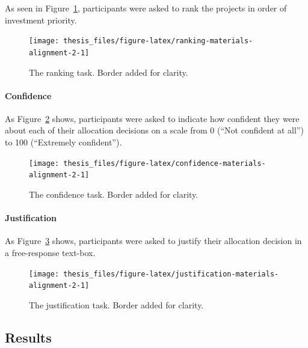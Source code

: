 \documentclass[a4paper, nobind, dvipsnames]{templates/ociamthesis}
\theoremstyle{definition}
\theoremstyle{definition}
\theoremstyle{definition}
\theoremstyle{definition}
\theoremstyle{remark}
\begin{document}
As seen in Figure~\ref{fig:ranking-materials-alignment-2}, participants were
asked to rank the projects in order of investment priority.



\begin{figure}
\texttt{[image: thesis\_files/figure-latex/ranking-materials-alignment-2-1]} \caption{The ranking task. Border added for clarity.}\label{fig:ranking-materials-alignment-2}
\end{figure}

\hypertarget{confidence-materials-alignment-2}{%
\paragraph{Confidence}\label{confidence-materials-alignment-2}}

As Figure~\ref{fig:confidence-materials-alignment-2} shows, participants were
asked to indicate how confident they were about each of their allocation
decisions on a scale from 0 (``Not confident at all'') to 100 (``Extremely
confident'').



\begin{figure}
\texttt{[image: thesis\_files/figure-latex/confidence-materials-alignment-2-1]} \caption{The confidence task. Border added for clarity.}\label{fig:confidence-materials-alignment-2}
\end{figure}

\hypertarget{justification-materials-alignment-2}{%
\paragraph{Justification}\label{justification-materials-alignment-2}}

As Figure~\ref{fig:justification-materials-alignment-2} shows, participants
were asked to justify their allocation decision in a free-response text-box.



\begin{figure}
\texttt{[image: thesis\_files/figure-latex/justification-materials-alignment-2-1]} \caption{The justification task. Border added for clarity.}\label{fig:justification-materials-alignment-2}
\end{figure}

\hypertarget{results-alignment-2-appendix}{%
\subsection{Results}\label{results-alignment-2-appendix}}
\end{document}
